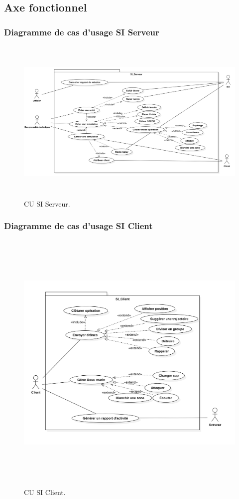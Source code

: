 	\subsection{Axe fonctionnel}



\subsubsection{Diagramme de cas d'usage SI Serveur}
\begin{figure}[H]
	\centering
	\includegraphics[height=8cm]{img/CUSI_Serveur.png} 
	\caption{CU SI Serveur.}
\end{figure}
\subsubsection{Diagramme de cas d'usage SI Client}
\begin{figure}[H]
	\centering
	\includegraphics[height=13cm]{img/CUSI_Client.png} 
	\caption{CU SI Client.}
\end{figure}


